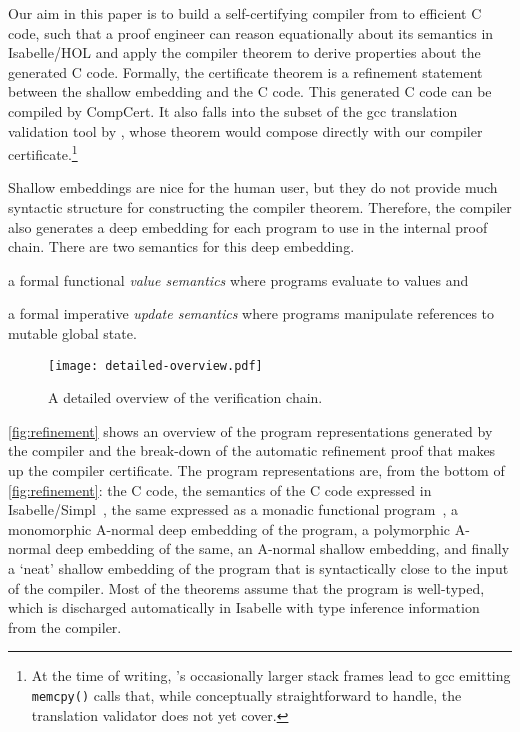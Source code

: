 \documentclass[9pt\ifFinal\else,preprint,nocopyrightspace\fi,\ifAlpha\else natbib,authoryear\fi]{sigplanconf}
\begin{document}
Our aim in this paper is to build a self-certifying compiler from \cdsl to
efficient C code, such that a proof engineer can reason equationally about
its semantics in Isabelle/HOL and apply the compiler theorem to derive
properties about the generated C code. Formally, the certificate theorem is a
refinement statement between the shallow embedding and the C code. This
generated C code can be compiled by CompCert. It also falls into the subset
of the gcc translation validation tool by \citet{Sewell_MK_13}, whose theorem
would compose directly with our compiler certificate.\footnote{At the time of writing, \cdsl's occasionally larger stack frames lead to gcc emitting
\texttt{memcpy()} calls that, while conceptually straightforward to handle,
the translation validator does not yet cover.}

Shallow embeddings are nice for the human user, but they do not provide much
syntactic structure for constructing the compiler theorem.
Therefore, the compiler also generates a deep embedding for each \CDSL
program to use in the internal proof chain.
There are two semantics for this deep embedding.
\begin{inparaenum}[(1)]
\item a formal functional \emph{value semantics} where programs evaluate to values and 
\item a formal imperative \emph{update semantics} where programs manipulate references to mutable global state.
\end{inparaenum}

 
\begin{figure}[tbh]
    \begin{center}
      \texttt{[image: detailed-overview.pdf]}
    \end{center}
    \caption{A detailed overview of the verification chain.}
\label{fig:refinement}
  \end{figure}

\noindent 
\autoref{fig:refinement} shows an overview of the program representations
generated by the compiler and the break-down of the automatic refinement
proof that makes up the compiler certificate. The program representations
are, from the bottom of \autoref{fig:refinement}: the C code, the semantics
of the C code expressed in Isabelle/Simpl~\citep{schirmer:phd}, the same
expressed as a monadic functional
program~\citep{Greenaway_AK_12,Greenaway_LAK_14}, a monomorphic A-normal deep
embedding of the \cdsl program, a polymorphic A-normal deep embedding of the
same, an A-normal shallow embedding, and finally a `neat' shallow embedding
of the \cdsl program that is syntactically close to the \cdsl input of the
compiler. Most of the theorems assume that the \cdsl program is well-typed,
which is discharged automatically in Isabelle with type inference
information from the compiler.
\end{document}
